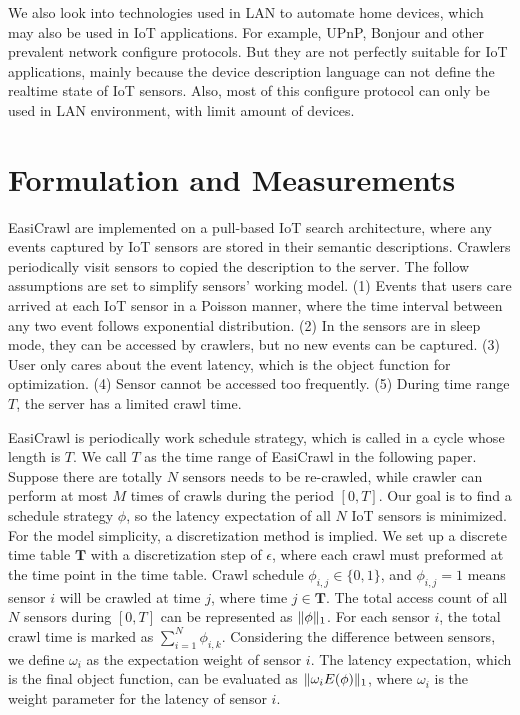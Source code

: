 \documentclass[conference]{IEEEtran}
\begin{document}
We also look into technologies used in LAN to automate home devices, which may also be used in IoT applications. For example, UPnP\cite{UPnP}, Bonjour\cite{Bonjour} and other prevalent network configure protocols. But they are not perfectly suitable for IoT applications, mainly because the device description language can not define the realtime state of IoT sensors. Also, most of this configure protocol can only be used in LAN environment, with limit amount of devices.

\section{Formulation and Measurements}\label{formulation}
EasiCrawl are implemented on a pull-based IoT search architecture, where any events captured by IoT sensors are stored in their semantic descriptions. Crawlers periodically visit sensors to copied the description to the server.
The follow assumptions are set to simplify sensors' working model. 
(1) Events that users care arrived at each IoT sensor in a Poisson manner, where the time interval between any two event follows exponential distribution. 
(2) In the sensors are in sleep mode, they can be accessed by crawlers, but no new events can be captured.
(3) User only cares about the event latency, which is the object function for optimization.
(4) Sensor cannot be accessed too frequently.
(5) During time range $T$, the server has a limited crawl time.


EasiCrawl is periodically work schedule strategy, which is called in a cycle whose length is $T$. We call $T$ as the time range of EasiCrawl in the following paper.
Suppose there are totally $N$ sensors needs to be re-crawled, while crawler can perform at most $M$ times of crawls during the period $[0, T]$. Our goal is to find a schedule strategy $\phi$, so the latency expectation of all $N$ IoT sensors is minimized. 
For the model simplicity, a discretization method is implied. We set up a discrete time table $\mathbf{T}$ with a discretization step of $\epsilon$, where each crawl must preformed at the time point in the time table.
Crawl schedule $\phi_{i,j}\in\{0,1\}$, and $\phi_{i,j}=1$ means sensor $i$ will be crawled at time $j$, where time $j\in\mathbf{T}$.
The total access count of all $N$ sensors during $[0, T]$ can be represented as $\Arrowvert\phi\Arrowvert_{1}$. For each sensor $i$, the total crawl time is marked as $\sum_{i=1}^{N}\phi_{i,k}$. 
Considering the difference between sensors, we define $\omega_i$ as the expectation weight of sensor $i$. The latency expectation, which is the final object function, can be evaluated as $\Arrowvert \omega_i E(\phi) \Arrowvert_{1}$, where $\omega_i$ is the weight parameter for the latency of sensor $i$.
\end{document}
